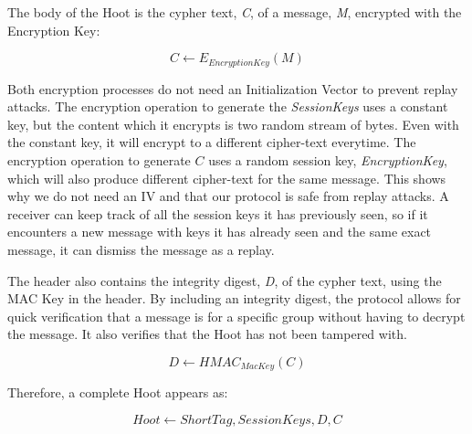 The body of the Hoot is the cypher text, \textit{C}, of a message, \textit{M}, encrypted with the Encryption Key:

\begin{equation*}
	C \leftarrow E_{\mathit{EncryptionKey}}\left(M\right)
\end{equation*}

Both encryption processes do not need an Initialization Vector to prevent replay attacks. The encryption operation to generate the \textit{SessionKeys} uses a constant key, but the content which it encrypts is two random stream of bytes. Even with the constant key, it will encrypt to a different cipher-text everytime. The encryption operation to generate $C$ uses a random session key, \textit{EncryptionKey}, which will also produce different cipher-text for the same message. This shows why we do not need an IV and that our protocol is safe from replay attacks. A receiver can keep track of all the session keys it has previously seen, so if it encounters a new message with keys it has already seen and the same exact message, it can dismiss the message as a replay.

The header also contains the integrity digest, \textit{D}, of the cypher text, using the MAC Key in the header. By including an integrity digest, the protocol allows for quick verification that a message is for a specific group without having to decrypt the message. It also verifies that the Hoot has not been tampered with. 

\begin{equation*}
	D \leftarrow \mathit{HMAC}_{\mathit{MacKey}}\left(C\right)
\end{equation*}

Therefore, a complete Hoot appears as:

\begin{equation*}
	\mathit{Hoot} \leftarrow \mathit{ShortTag},\mathit{SessionKeys},D,C
\end{equation*}